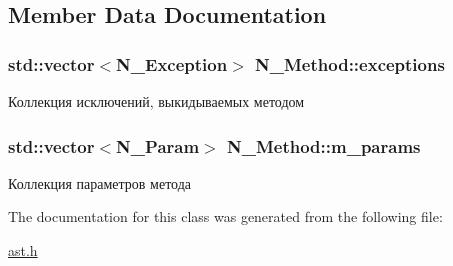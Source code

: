 \subsection{Member Data Documentation}
\hypertarget{classN__Method_aad146c11802d6e438c39377249d7b17d}{}
\subsubsection[{exceptions}]{\setlength{\rightskip}{0pt plus 5cm}std\+::vector$<${\bf N\+\_\+\+Exception}$>$ N\+\_\+\+Method\+::exceptions\hspace{0.3cm}{\ttfamily [protected]}}\label{classN__Method_aad146c11802d6e438c39377249d7b17d}


Коллекция исключений, выкидываемых методом 

\hypertarget{classN__Method_a3c99f1955b023fff1d6a0930496beb7f}{}
\subsubsection[{m\+\_\+params}]{\setlength{\rightskip}{0pt plus 5cm}std\+::vector$<${\bf N\+\_\+\+Param}$>$ N\+\_\+\+Method\+::m\+\_\+params\hspace{0.3cm}{\ttfamily [protected]}}\label{classN__Method_a3c99f1955b023fff1d6a0930496beb7f}


Коллекция параметров метода 



The documentation for this class was generated from the following file\+:\begin{DoxyCompactItemize}
\item 
\hyperlink{ast_8h}{ast.\+h}\end{DoxyCompactItemize}

